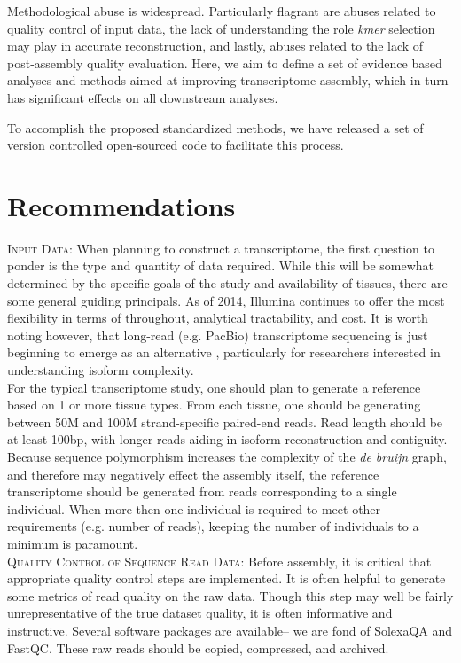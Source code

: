 \documentclass[11pt]{article}
\begin{document}
Methodological abuse is widespread. Particularly flagrant are abuses related to quality control of input data, the lack of understanding the role \textit{kmer} selection may play in accurate reconstruction, and lastly, abuses related to the lack of post-assembly quality evaluation. Here, we aim to define a set of evidence based analyses and methods aimed at improving transcriptome assembly, which in turn has significant effects on all downstream analyses. 

To accomplish the proposed standardized methods, we have released a set of version controlled open-sourced code to facilitate this process.   

\section*{Recommendations}

\textsc{Input Data}: When planning to construct a transcriptome, the first question to ponder is the type and quantity of data required. While this will be somewhat determined by the specific goals of the study and availability of tissues, there are some general guiding principals. As of 2014, Illumina continues to offer the most flexibility in terms of throughout, analytical tractability, and cost. It is worth noting however, that long-read (e.g. PacBio) transcriptome sequencing is just beginning to emerge as an alternative \citep{Au:2013hp}, particularly for researchers interested in understanding isoform complexity. \\

For the typical transcriptome study, one should plan to generate a reference based on 1 or more tissue types. From each tissue, one should be generating between 50M and 100M strand-specific paired-end reads. Read length should be at least 100bp, with longer reads aiding in isoform reconstruction and contiguity. Because sequence polymorphism increases the complexity of the \textit{de bruijn} graph, and therefore may negatively effect the assembly itself, the reference transcriptome should be generated from reads corresponding to a single individual. When more then one individual is required to meet other requirements (e.g. number of reads), keeping the number of individuals to a minimum is paramount. \\

\textsc{Quality Control of Sequence Read Data}: Before assembly, it is critical that appropriate quality control steps are implemented. It is often helpful to generate some metrics of read quality on the raw data. Though this step may well be fairly unrepresentative of the true dataset quality, it is often informative and instructive. Several software packages are available-- we are fond of SolexaQA and FastQC. These raw reads should be copied, compressed, and archived. \\
\end{document}
